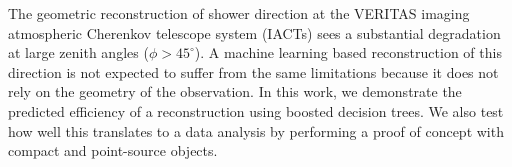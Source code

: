 \documentclass[main.tex]{subfiles}
\begin{document}
The geometric reconstruction of shower direction at the VERITAS imaging atmospheric Cherenkov telescope system (IACTs) sees a substantial degradation at large zenith angles ($\phi>45^\circ$). A machine learning based reconstruction of this direction is not expected to suffer from the same limitations because it does not rely on the geometry of the observation. In this work, we demonstrate the predicted efficiency of a reconstruction using boosted decision trees. We also test how well this translates to a data analysis by performing a proof of concept with compact and point-source objects.
\end{document}
